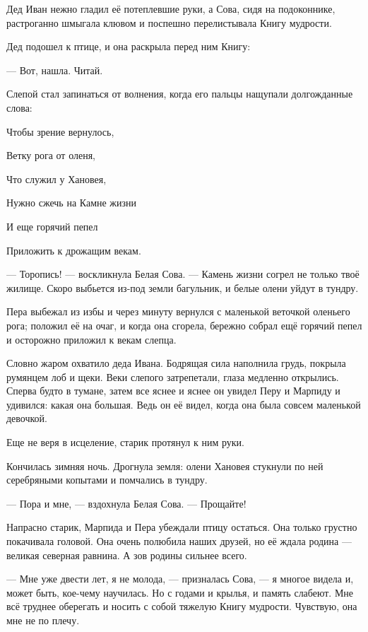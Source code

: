 \documentclass[12pt, a4paper, openany]{book}
\begin{document}
	Дед Иван нежно гладил её потеплевшие руки, а Сова, сидя на подоконнике, растроганно шмыгала клювом и поспешно перелистывала Книгу мудрости.
	
	Дед подошел к птице, и она раскрыла перед ним Книгу:
	
	— Вот, нашла. Читай.
	
	Слепой стал запинаться от волнения, когда его пальцы нащупали долгожданные слова:
	
	
	
	
\qquad \qquad \qquad 	Чтобы зрение вернулось,
	
\qquad \qquad \qquad 	Ветку рога от оленя,
	
\qquad \qquad \qquad 	Что служил у Хановея,
	
\qquad \qquad \qquad 	Нужно сжечь на Камне жизни
	
\qquad \qquad \qquad 	И еще горячий пепел
	
\qquad \qquad \qquad 	Приложить к дрожащим векам.
	
	
	— Торопись! — воскликнула Белая Сова. — Камень жизни согрел не только твоё жилище. Скоро выбьется из-под земли багульник, и белые олени уйдут в тундру.
	
	Пера выбежал из избы и через минуту вернулся с маленькой веточкой оленьего рога; положил её на очаг, и когда она сгорела, бережно собрал ещё горячий пепел и осторожно приложил к векам слепца.
	
	Словно жаром охватило деда Ивана. Бодрящая сила наполнила грудь, покрыла румянцем лоб и щеки. Веки слепого затрепетали, глаза медленно открылись. Сперва будто в тумане, затем все яснее и яснее он увидел Перу и Марпиду и удивился: какая она большая. Ведь он её видел, когда она была совсем маленькой девочкой.
	
	Еще не веря в исцеление, старик протянул к ним руки.
	
	Кончилась зимняя ночь. Дрогнула земля: олени Хановея стукнули по ней серебряными копытами и помчались в тундру.
	
	— Пора и мне, — вздохнула Белая Сова. — Прощайте!
	
	Напрасно старик, Марпида и Пера убеждали птицу остаться. Она только грустно покачивала головой. Она очень полюбила наших друзей, но её ждала родина — великая северная равнина. А зов родины сильнее всего.
	
	— Мне уже двести лет, я не молода, — призналась Сова, — я многое видела и, может быть, кое-чему научилась. Но с годами и крылья, и память слабеют. Мне всё труднее оберегать и носить с собой тяжелую Книгу мудрости. Чувствую, она мне не по плечу.
	
\end{document}
